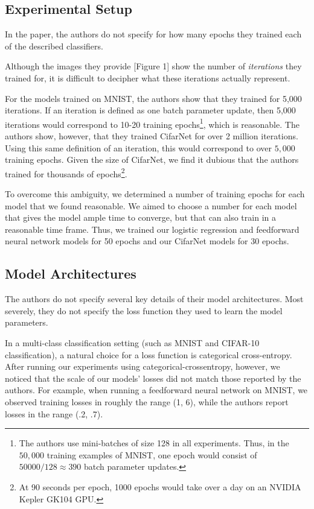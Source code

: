 \documentclass[letterpaper, 10 pt, conference]{ieeeconf}  %
\begin{document}
\subsection{Experimental Setup}

In the paper, the authors do not specify for how many epochs they trained each of the described classifiers.

Although the images they provide [Figure 1] show the number of \emph{iterations} they trained for, it is difficult to decipher what these iterations actually represent. 

For the models trained on MNIST, the authors show that they trained for 5,000 iterations. If an iteration is defined as one batch parameter update, then 5,000 iterations would correspond to 10-20 training epochs\footnote{The authors use mini-batches of size 128 in all experiments. Thus, in the $50,000$ training examples of MNIST, one epoch would consist of $50000/128 \approx 390$ batch parameter updates.}, which is reasonable. The authors show, however, that they trained CifarNet for over 2 million iterations. Using this same definition of an iteration, this would correspond to over $5,000$ training epochs. Given the size of CifarNet, we find it dubious that the authors trained for thousands of epochs\footnote{At 90 seconds per epoch, 1000 epochs would take over a day on an NVIDIA Kepler GK104 GPU.}.

To overcome this ambiguity, we determined a number of training epochs for each model that we found reasonable. We aimed to choose a number for each model that gives the model ample time to converge, but that can also train in a reasonable time frame. Thus, we trained our logistic regression and feedforward neural network models for 50 epochs and our CifarNet models for 30 epochs. 

\subsection{Model Architectures}

The authors do not specify several key details of their model architectures. Most severely, they do not specify the loss function they used to learn the model parameters. 

In a multi-class classification setting (such as MNIST and CIFAR-10 classification), a natural choice for a loss function is categorical cross-entropy. After running our experiments using categorical-crossentropy, however, we noticed that the scale of our models' losses did not match those reported by the authors. For example, when running a feedforward neural network on MNIST, we observed training losses in roughly the range (1, 6), while the authors report losses in the range (.2, .7). 
\end{document}
